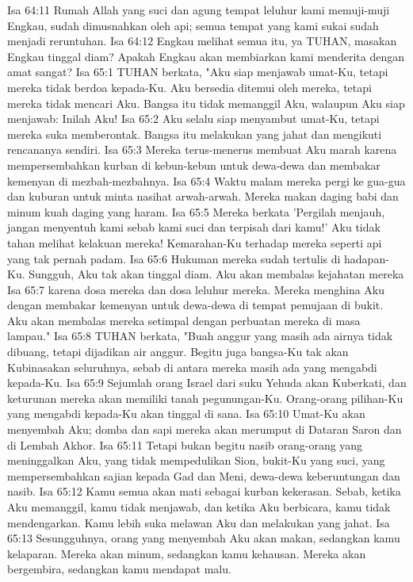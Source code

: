 Isa 64:11  Rumah Allah yang suci dan agung tempat leluhur kami memuji-muji Engkau, sudah dimusnahkan oleh api; semua tempat yang kami sukai sudah menjadi reruntuhan.
Isa 64:12  Engkau melihat semua itu, ya TUHAN, masakan Engkau tinggal diam? Apakah Engkau akan membiarkan kami menderita dengan amat sangat?
Isa 65:1  TUHAN berkata, "Aku siap menjawab umat-Ku, tetapi mereka tidak berdoa kepada-Ku. Aku bersedia ditemui oleh mereka, tetapi mereka tidak mencari Aku. Bangsa itu tidak memanggil Aku, walaupun Aku siap menjawab: Inilah Aku!
Isa 65:2  Aku selalu siap menyambut umat-Ku, tetapi mereka suka memberontak. Bangsa itu melakukan yang jahat dan mengikuti rencananya sendiri.
Isa 65:3  Mereka terus-menerus membuat Aku marah karena mempersembahkan kurban di kebun-kebun untuk dewa-dewa dan membakar kemenyan di mezbah-mezbahnya.
Isa 65:4  Waktu malam mereka pergi ke gua-gua dan kuburan untuk minta nasihat arwah-arwah. Mereka makan daging babi dan minum kuah daging yang haram.
Isa 65:5  Mereka berkata 'Pergilah menjauh, jangan menyentuh kami sebab kami suci dan terpisah dari kamu!' Aku tidak tahan melihat kelakuan mereka! Kemarahan-Ku terhadap mereka seperti api yang tak pernah padam.
Isa 65:6  Hukuman mereka sudah tertulis di hadapan-Ku. Sungguh, Aku tak akan tinggal diam. Aku akan membalas kejahatan mereka
Isa 65:7  karena dosa mereka dan dosa leluhur mereka. Mereka menghina Aku dengan membakar kemenyan untuk dewa-dewa di tempat pemujaan di bukit. Aku akan membalas mereka setimpal dengan perbuatan mereka di masa lampau."
Isa 65:8  TUHAN berkata, "Buah anggur yang masih ada airnya tidak dibuang, tetapi dijadikan air anggur. Begitu juga bangsa-Ku tak akan Kubinasakan seluruhnya, sebab di antara mereka masih ada yang mengabdi kepada-Ku.
Isa 65:9  Sejumlah orang Israel dari suku Yehuda akan Kuberkati, dan keturunan mereka akan memiliki tanah pegunungan-Ku. Orang-orang pilihan-Ku yang mengabdi kepada-Ku akan tinggal di sana.
Isa 65:10  Umat-Ku akan menyembah Aku; domba dan sapi mereka akan merumput di Dataran Saron dan di Lembah Akhor.
Isa 65:11  Tetapi bukan begitu nasib orang-orang yang meninggalkan Aku, yang tidak mempedulikan Sion, bukit-Ku yang suci, yang mempersembahkan sajian kepada Gad dan Meni, dewa-dewa keberuntungan dan nasib.
Isa 65:12  Kamu semua akan mati sebagai kurban kekerasan. Sebab, ketika Aku memanggil, kamu tidak menjawab, dan ketika Aku berbicara, kamu tidak mendengarkan. Kamu lebih suka melawan Aku dan melakukan yang jahat.
Isa 65:13  Sesungguhnya, orang yang menyembah Aku akan makan, sedangkan kamu kelaparan. Mereka akan minum, sedangkan kamu kehausan. Mereka akan bergembira, sedangkan kamu mendapat malu.
